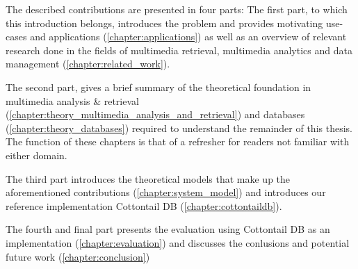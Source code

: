 The described contributions are presented in four parts: The first part, to which this introduction belongs, introduces the problem and provides motivating use-cases and applications (\cref{chapter:applications}) as well as an overview of relevant research done in the fields of multimedia retrieval, multimedia analytics and data management (\cref{chapter:related_work}).

The second part, gives a brief summary of the theoretical foundation in multimedia analysis \& retrieval (\cref{chapter:theory_multimedia_analysis_and_retrieval}) and databases (\cref{chapter:theory_databases}) required to understand the remainder of this thesis. The function of these chapters is that of a refresher for readers not familiar with either domain.

The third part introduces the theoretical models that make up the aforementioned contributions (\cref{chapter:system_model}) and introduces our reference implementation Cottontail DB (\cref{chapter:cottontaildb}).

The fourth and final part presents the evaluation using Cottontail DB as an implementation (\cref{chapter:evaluation}) and discusses the conlusions and potential future work (\cref{chapter:conclusion})